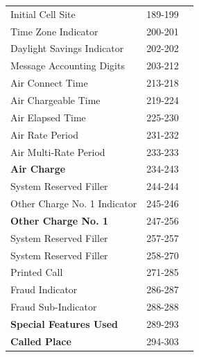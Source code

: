 \documentclass[12pt,twoside]{article}
\begin{document}
\begin{longtable}{lrl}
 Initial Cell Site                         &            189-199  &                        \\
 Time Zone Indicator                       &            200-201  &                        \\
 Daylight Savings Indicator                &            202-202  &                        \\
 Message Accounting Digits                 &            203-212  &                        \\
 Air Connect Time                          &            213-218  &                        \\
 Air Chargeable Time                       &            219-224  &                        \\
 Air Elapsed Time                          &            225-230  &                        \\
 Air Rate Period                           &            231-232  &                        \\
 Air Multi-Rate Period                     &            233-233  &                        \\
 \textbf{Air Charge}                       &            234-243  &                        \\
 System Reserved Filler                    &            244-244  &                        \\
 Other Charge No. 1 Indicator              &            245-246  &                        \\
 \textbf{Other Charge No. 1}               &            247-256  &                        \\
 System Reserved Filler                    &            257-257  &                        \\
 System Reserved Filler                    &            258-270  &                        \\
 Printed Call                              &            271-285  &                        \\
 Fraud Indicator                           &            286-287  &                        \\
 Fraud Sub-Indicator                       &            288-288  &                        \\
 \textbf{Special Features Used}            &            289-293  &                        \\
 \textbf{Called Place}                     &            294-303  &                        \\

\end{longtable}
\end{document}
